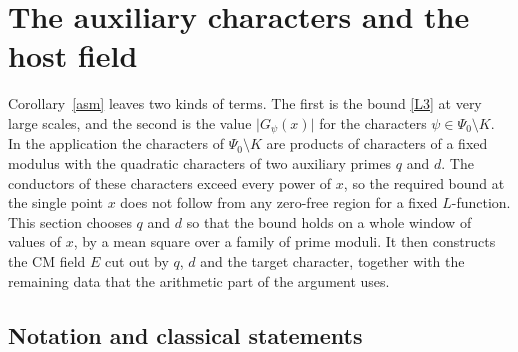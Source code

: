 \section{The auxiliary characters and the host field}\label{sec:auxiliary}

Corollary~\ref{asm} leaves two kinds of terms. The first is the bound \eqref{L3} at very large scales, and the second is the value $\lvert G_\psi(x)\rvert$ for the characters $\psi\in\Psi_0\setminus K$. In the application the characters of $\Psi_0\setminus K$ are products of characters of a fixed modulus with the quadratic characters of two auxiliary primes $q$ and $d$. The conductors of these characters exceed every power of $x$, so the required bound at the single point $x$ does not follow from any zero-free region for a fixed $L$-function. This section chooses $q$ and $d$ so that the bound holds on a whole window of values of $x$, by a mean square over a family of prime moduli. It then constructs the CM field $E$ cut out by $q$, $d$ and the target character, together with the remaining data that the arithmetic part of the argument uses.

\subsection{Notation and classical statements}\label{sec:classical}

